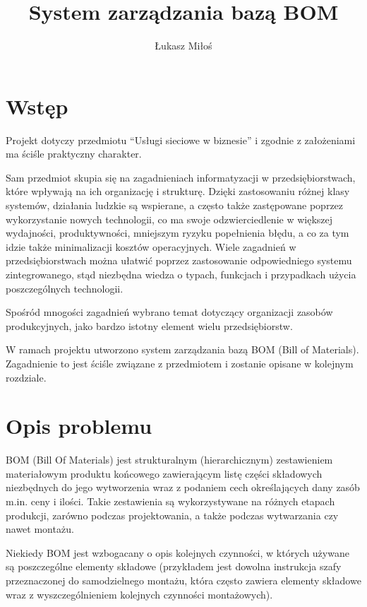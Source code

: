 \documentclass[12pt,twoside]{article}
\author{Łukasz Miłoś}
\title{System zarządzania bazą BOM}
\begin{document}
\maketitle
\blankpage

\tableofcontents
\clearpage
\blankpage

\section{Wstęp}
Projekt dotyczy przedmiotu \enquote{Usługi sieciowe w biznesie} i zgodnie z założeniami ma ściśle praktyczny charakter.

Sam przedmiot skupia się na zagadnieniach informatyzacji w przedsiębiorstwach, które wpływają na ich organizację i strukturę. Dzięki zastosowaniu różnej klasy systemów, działania ludzkie są wspierane, a często także zastępowane poprzez wykorzystanie nowych technologii, co ma swoje odzwierciedlenie w większej wydajności, produktywności, mniejszym ryzyku popełnienia błędu, a co za tym idzie także minimalizacji kosztów operacyjnych. Wiele zagadnień w przedsiębiorstwach można ułatwić poprzez zastosowanie odpowiedniego systemu zintegrowanego, stąd niezbędna wiedza o typach, funkcjach i przypadkach użycia poszczególnych technologii.

Spośród mnogości zagadnień wybrano temat dotyczący organizacji zasobów produkcyjnych, jako bardzo istotny element wielu przedsiębiorstw.

W ramach projektu utworzono system zarządzania bazą BOM (Bill of Materials). Zagadnienie to jest ściśle związane z przedmiotem i zostanie opisane w kolejnym rozdziale.

\clearpage

\section{Opis problemu}

BOM (Bill Of Materials) jest strukturalnym (hierarchicznym) zestawieniem materiałowym produktu końcowego zawierającym listę części składowych niezbędnych do jego wytworzenia wraz z podaniem cech określających dany zasób m.in. ceny i ilości. Takie zestawienia są wykorzystywane na różnych etapach produkcji, zarówno podczas projektowania, a także podczas wytwarzania czy nawet montażu.

Niekiedy BOM jest wzbogacany o opis kolejnych czynności, w których używane są poszczególne elementy składowe (przykładem jest dowolna instrukcja szafy przeznaczonej do samodzielnego montażu, która często zawiera elementy składowe wraz z wyszczególnieniem kolejnych czynności montażowych).
\end{document}
